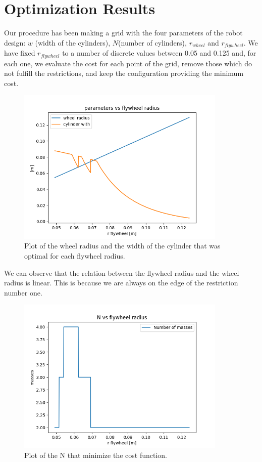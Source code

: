 \section{Optimization Results} \label{sec: parameters results}

Our procedure has been making a grid with the four parameters of the robot 
design: $w$ (width of the cylinders), $N$(number of cylinders), $r_{wheel}$ and $r_{flywheel}$.
We have fixed $r_{flywheel}$ to a number of discrete values between 0.05 and 0.125 and, for each one, we evaluate the cost for each point of the grid,
remove those which do not fulfill the restrictions, and keep the configuration providing the minimum cost. 

\begin{figure}[H]
	\centering
	\includegraphics[width=10cm]{img/optimization/parameters.png}
	\caption{Plot of the wheel radius and the width of the cylinder that was optimal for each flywheel radius.}
	\label{fig:Parameters plot}
\end{figure}

We can observe that the relation between the flywheel radius and 
the wheel radius is linear. This is because we are always on the
edge of the restriction number one.

\begin{figure}[H]
	\centering
	\includegraphics[width=10cm]{img/optimization/N.png}
	\caption{Plot of the N that minimize the cost function.}
	\label{fig:Parameters plot}
\end{figure}


